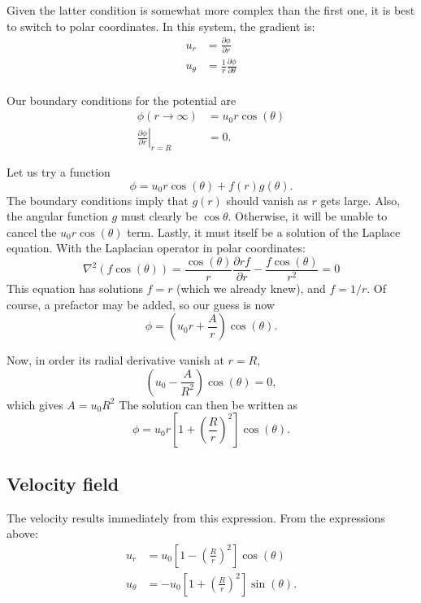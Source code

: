 Given the latter condition is somewhat more complex than the first
one, it is best to switch to polar coordinates. In
this system, the gradient is:
\begin{align}
u_r &= \frac{\partial\phi}{\partial r}\\
u_\theta &= \frac{1}{r} \frac{\partial\phi}{\partial \theta}\\
\end{align}


Our boundary conditions for the potential are
\begin{align}
  \phi(r \to \infty ) &=  u_0 r \cos(\theta)  \\
  \left. \frac{\partial\phi}{\partial r} \right|_{r = R } &= 0  .
\end{align}

Let us try a function
\[
\phi =  u_0 r \cos(\theta)  + f(r) g(\theta) .
\]
The boundary conditions imply that $g(r)$ should vanish as $r$ gets
large. Also, the angular function $g$ must clearly be
$\cos\theta$. Otherwise, it will be unable to cancel the $u_0
r \cos(\theta)$ term. Lastly, it must itself be a solution of the
Laplace equation. With the Laplacian operator in
polar coordinates:
\[
\nabla^2 (f \cos(\theta ) ) =
\frac{ \cos(\theta ) }{r} \frac{\partial r f}{\partial r} -
\frac{ f \cos(\theta ) }{r^2} = 0
\]
This equation has solutions $f=r$ (which we already knew), and
$f=1/r$. Of course, a prefactor may be added, so our guess is now
\[
\phi = \left( u_0 r + \frac{A}{r} \right) \cos(\theta) .
\]

Now, in order its radial derivative vanish at $r=R$,
\[
 \left ( u_0  - \frac{A}{R^2} \right) \cos(\theta) = 0 ,
\]
which gives $A=u_0 R^2 $ The solution can then be written as
\[
\phi = u_0 r \left[ 1 + \left( \frac{R}{r}\right)^2 \right] \cos(\theta) .
\]

\subsection{Velocity field}

The velocity results immediately from this expression. From the
expressions above:
\begin{align}
u_r     &=   u_0  \left[ 1 - \left( \frac{R}{r}\right)^2 \right] \cos(\theta) \\
u_\theta &=  - u_0  \left[ 1 + \left( \frac{R}{r}\right)^2 \right] \sin(\theta) .
\end{align}

